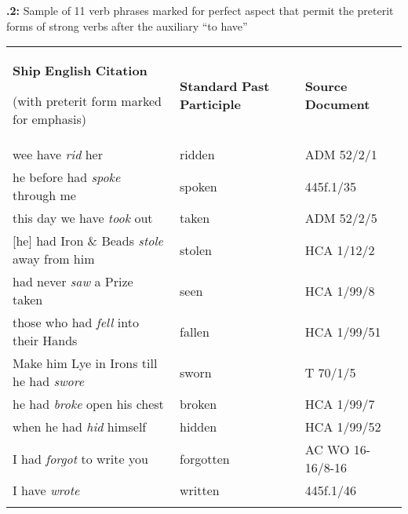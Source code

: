 \textbf{.2:} Sample of 11 verb phrases marked for perfect aspect that permit the preterit forms of strong verbs after the auxiliary “to have”

\tablefirsthead{}

\tabletail{}
\tablelasttail{}
\begin{tabularx}{\textwidth}{XXX}

\lsptoprule

\textbf{Ship} \textbf{English} \textbf{Citation} 

(with preterit form marked for emphasis) & \textbf{Standard} \textbf{Past} \textbf{Participle} & \textbf{Source} \textbf{Document}\\
wee have \textit{rid} her & ridden & ADM 52/2/1\\
he before had \textit{spoke} through me & spoken & 445f.1/35\\
this day we have \textit{took} out & taken & ADM 52/2/5\\
{}[he] had Iron \& Beads \textit{stole} away from him & stolen & HCA 1/12/2\\
had never \textit{saw} a Prize taken & seen & HCA 1/99/8\\
those who had \textit{fell} into their Hands & fallen & HCA 1/99/51\\
Make him Lye in Irons till he had \textit{swore} & sworn & T 70/1/5\\
he had \textit{broke} open his chest & broken & HCA 1/99/7\\
when he had \textit{hid} himself & hidden & HCA 1/99/52\\
I had \textit{forgot} to write you & forgotten & AC WO 16-16/8-16\\
I have \textit{wrote} & written & 445f.1/46\\
\lspbottomrule
\end{tabularx}
